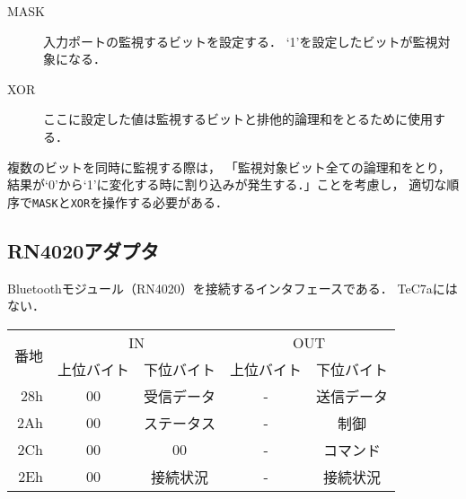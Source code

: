 \begin{description}
\item[MASK]
  入力ポートの監視するビットを設定する．
  `1'を設定したビットが監視対象になる．
\item[XOR]
  ここに設定した値は監視するビットと排他的論理和をとるために使用する．
\end{description}

複数のビットを同時に監視する際は，
「監視対象ビット全ての論理和をとり，
結果が`0'から`1'に変化する時に割り込みが発生する．」ことを考慮し，
適切な順序で\texttt{MASK}と\texttt{XOR}を操作する必要がある．

\subsection{RN4020アダプタ}
Bluetoothモジュール（RN4020）を接続するインタフェースである．
TeC7aにはない．

\begin{center}
  \small\begin{tabular}{| r | c | c || c | c |}\hline
    \multirow{2}{*}{番地}
    & \multicolumn{2}{|c||}{IN}
    & \multicolumn{2}{c|}{OUT}
    \\\cline{2-5}
         & 上位バイト & 下位バイト & 上位バイト & 下位バイト
    \\\hline\hline
    28h  &  00 & 受信データ
         &  -  & 送信データ \\\hline
    2Ah  &  00 & ステータス
         &  -  & 制御 \\\hline
    2Ch  &  00 & 00
         &  -  & コマンド \\\hline
    2Eh  &  00 & 接続状況
         &  -  & 接続状況 \\\hline
  \end{tabular}
\end{center}

